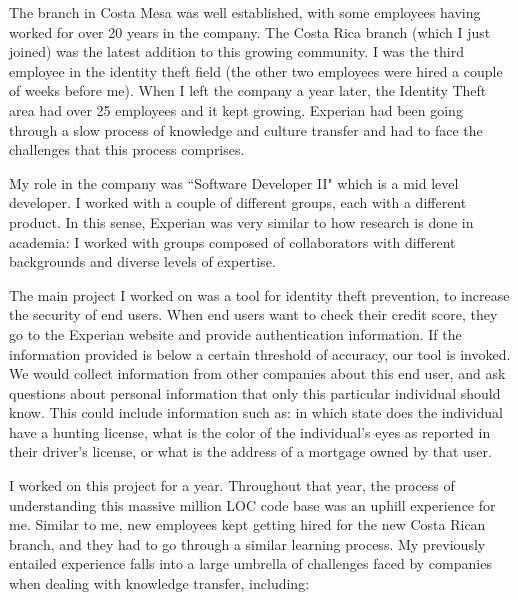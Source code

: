 \documentclass[12pt, letterpaper]{article}
\begin{document}
The branch in Costa Mesa was well established, with some employees having worked for over 20 years in the company. 
The Costa Rica branch (which I just joined) was the 
latest addition to this growing 
community. I was the third employee in the identity theft field (the other two employees were hired a couple of 
weeks before me). When I left the company a year later, the Identity Theft area had over 25 employees and it 
kept growing. Experian had been going through a slow process of knowledge and culture transfer and had to face
the challenges that this process comprises.

My role in the company was ``Software Developer II" which is a mid level developer. I worked with a couple
of different groups, each with a different product. In this sense, Experian was very similar to how research 
is done in academia: I worked with groups composed of collaborators with different 
backgrounds and diverse levels of expertise.

The main project I worked on was a tool for identity theft prevention, to increase the security of end users.
When end users want to check their credit score, they go to the Experian website and provide authentication
information. If the information provided is below a certain threshold of accuracy, our tool is invoked. We would collect 
information from other companies about this end user, and ask questions about personal information that only this particular
individual should know. This could include information such as: in which state does the individual have a hunting license, 
what is the color of the individual's eyes as reported in their driver's license, or what is the address of a mortgage
owned by that user.

I worked on this project for a year. Throughout that year, the process of understanding this massive million LOC 
code base was an uphill experience for me. Similar to me, new employees kept getting hired for the new Costa Rican 
branch, and they had to go through a similar learning process. My previously entailed experience falls into a large
umbrella of challenges faced by companies when dealing with knowledge transfer, including:
\end{document}
